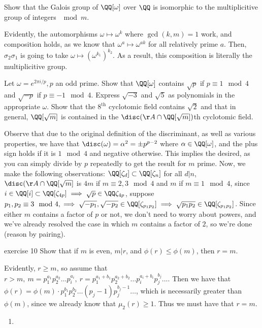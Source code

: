 \begin{problem}
Show that the Galois group of \(\QQ[\omega]\) over \(\QQ\) is isomorphic to the multiplicitive group of integers \(\mod m\).
\end{problem}
Evidently, the automorphisms \(\omega \mapsto \omega^k \) where \(\gcd(k,m)=1\) work, and composition holds, as we know that \(\omega^a \mapsto \omega^{ak}\) for all relatively prime \(a\). Then, \(\sigma_2\sigma_1\) is going to take \(\omega \mapsto (\omega^{k_1})^{k_2}\). As a result, this composition is literally the multiplicitive group.

\begin{problem}
Let \(\omega=e^{2\pi i/p}, p \) an odd prime. Show that \(\QQ[\omega]\) contains \(\sqrt{p}\) if \(p \equiv 1 \mod 4\) and \(\sqrt{-p}\) if \(p \equiv -1 \mod 4\). Express \(\sqrt{-3}\) and \(\sqrt{5}\) as polynomials in the appropriate \(\omega\). Show that the \(8^{\text{th}}\) cyclotomic field contains \(\sqrt{2}\) and that in general, \(\QQ[\sqrt{m}]\) is contained in the \(\disc(\AA \cap \QQ[\sqrt{m}])\)th cyclotomic field.
\end{problem}
Observe that due to the original definition of the discriminant, as well as various properties, we have that \(\disc(\omega) = \alpha^2 = \pm p^{p-2}\) where \(\alpha \in \QQ[\omega]\), and the plus sign holds if it is \(1 \mod 4\) and negative otherwise. This implies the desired, as you can simply divide by \(p\) repeatedly to get the result for \(m\) prime. Now, we make the following observations: \(\QQ[\zeta_d] \subset \QQ[\zeta_n]\) for all \(d|n\), \(\disc(\AA \cap \QQ[\sqrt{m}]\) is \(4m\) if \(m \equiv 2, 3 \mod 4\) and \(m\) if \(m \equiv 1 \mod 4\), since \(i \in \QQ[i] \subset \QQ[\zeta_{4p}] \implies \sqrt{p} \in \QQ\zeta_{4p}\), suppose \(p_1, p_2 \equiv 3 \mod 4, \implies \sqrt{-p_1}, \sqrt{-p_2} \in \QQ[\zeta_{p_1p_2}] \implies \sqrt{p_1p_2} \in \QQ[\zeta_{p_1p_2}]\). Since either \(m\) contains a factor of \(p\) or not, we don't need to worry about powers, and we've already resolved the case in which \(m\) contains a factor of \(2\), so we're done (reason by pairing).

\begin{problem}{exercise 10}
Show that if \(m\) is even, \(m|r\), and \(\phi(r) \leq \phi(m) \), then \(r=m\).
\end{problem}
Evidently, \(r \ge m\), so assume that \(r > m, \ m=p_1^{a_1}p_2^{a_2} \dots p_i^{a_i}, \ r = p_1^{a_1+b_1}p_2^{a_2+b_2}\dots p_i^{a_i+b_i}p_j^{b_j} \dots\). Then we have that \(\phi(r)=\phi(m)\cdot p_1^{b_1}p_2^{b_2}\dots (p_j-1)p_j^{b_j-1}\dots \), which is necessarily greater than \(\phi(m)\), since we already know that \(\mu_2(r) \ge 1\). Thus we must have that \(r=m\).
\begin{problem}
\begin{enumerate}[label=(\alph*)]
    \item 
\end{enumerate}
\end{problem}